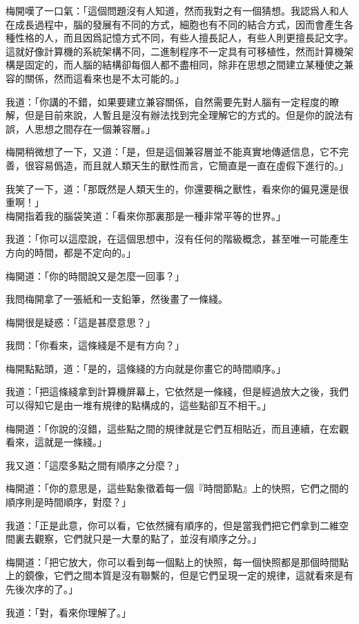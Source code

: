 梅開嘆了一口氣：「這個問題沒有人知道，然而我對之有一個猜想。我認爲人和人在成長過程中，腦的發展有不同的方式，細胞也有不同的結合方式，因而會產生各種性格的人，而且因爲記憶方式不同，有些人擅長記人，有些人則更擅長記文字。這就好像計算機的系統架構不同，二進制程序不一定具有可移植性，然而計算機架構是固定的，而人腦的結構卻每個人都不盡相同，除非在思想之間建立某種使之兼容的關係，然而這看來也是不太可能的。」

我道：「你講的不錯，如果要建立兼容關係，自然需要先對人腦有一定程度的瞭解，但是目前來說，人暫且是沒有辦法找到完全理解它的方式的。但是你的說法有誤，人思想之間存在一個兼容層。」

梅開稍微想了一下，又道：「是，但是這個兼容層並不能真實地傳遞信息，它不完善，很容易僞造，而且就人類天生的獸性而言，它簡直是一直在虛假下進行的。」

我笑了一下，道：「那既然是人類天生的，你還要稱之獸性，看來你的偏見還是很重啊！」
\\


梅開指着我的腦袋笑道：「看來你那裏那是一種非常平等的世界。」

我道：「你可以這麼說，在這個思想中，沒有任何的階級概念，甚至唯一可能產生方向的時間，都是不定向的。」

梅開道：「你的時間說又是怎麼一回事？」

我問梅開拿了一張紙和一支鉛筆，然後畫了一條綫。

梅開很是疑惑：「這是甚麼意思？」

我問：「你看來，這條綫是不是有方向？」

梅開點點頭，道：「是的，這條綫的方向就是你畫它的時間順序。」

我道：「把這條綫拿到計算機屏幕上，它依然是一條綫，但是經過放大之後，我們可以得知它是由一堆有規律的點構成的，這些點卻互不相干。」

梅開道：「你說的沒錯，這些點之間的規律就是它們互相貼近，而且連續，在宏觀看來，這就是一條綫。」

我又道：「這麼多點之間有順序之分麼？」

梅開道：「你的意思是，這些點象徵着每一個『時間節點』上的快照，它們之間的順序則是時間順序，對麼？」

我道：「正是此意，你可以看，它依然擁有順序的，但是當我們把它們拿到二維空間裏去觀察，它們就只是一大羣的點了，並沒有順序之分。」

梅開道：「把它放大，你可以看到每一個點上的快照，每一個快照都是那個時間點上的鏡像，它們之間本質是沒有聯繫的，但是它們呈現一定的規律，這就看來是有先後次序的了。」

我道：「對，看來你理解了。」

